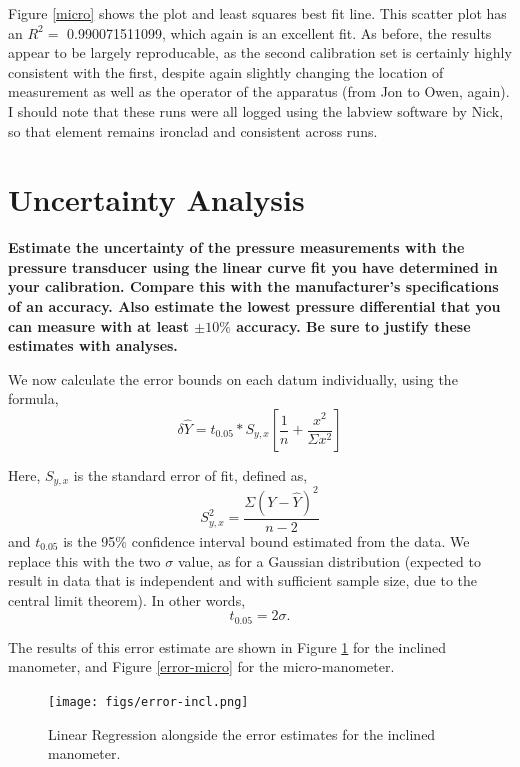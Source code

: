 \documentclass{article}
\begin{document}
Figure \ref{micro} shows the plot and least squares best fit line. 
This scatter plot has an $R^2 =$ 0.990071511099, which again is an
excellent fit. As before, the results appear to be largely reproducable,
as the second calibration set is certainly highly consistent with the
first, despite again slightly changing the location of measurement as
well as the operator of the apparatus (from Jon to Owen, again). I
should note that these runs were all logged using the labview software
by Nick, so that element remains ironclad and consistent across runs. 

\newpage
\section{Uncertainty Analysis}

\textbf{Estimate the uncertainty of the pressure measurements with the
pressure transducer using the linear curve fit you have determined in
your calibration. Compare this with the manufacturer's specifications of
an accuracy. Also estimate the lowest pressure differential that you can
measure with at least $\pm 10\%$ accuracy. Be sure to justify these
estimates with analyses.}

We now calculate the error bounds on each datum individually, using the formula, 
\begin{equation}
  \delta \hat Y = t_{0.05} * S_{y,x} \left[ \frac{1}{n} + \frac{x^2}{\Sigma x^2} \right]
\end{equation}

Here, $S_{y,x}$ is the standard error of fit, defined as, 
\begin{equation}
  S_{y,x}^2 = \frac{\Sigma (Y-\hat Y)^2}{n-2}
\end{equation}
and $t_{0.05}$ is the 95\% confidence interval bound estimated from the data. 
We replace this with the two $\sigma$ value, as for a Gaussian distribution 
(expected to result in data that is independent and with sufficient sample 
size, due to the central limit theorem). In other words, 
\begin{equation}
  t_{0.05} = 2 \sigma.
\end{equation}



The results of this error estimate are shown in Figure \ref{error-incl} 
for the inclined manometer, and  Figure \ref{error-micro} for the micro-manometer.

\begin{figure}[!htb]
  \begin{center}
    \texttt{[image: figs/error-incl.png]}
    \caption{Linear Regression alongside the error estimates for the inclined manometer. }
    \label{error-incl}
  \end{center}
\end{figure}
\end{document}
